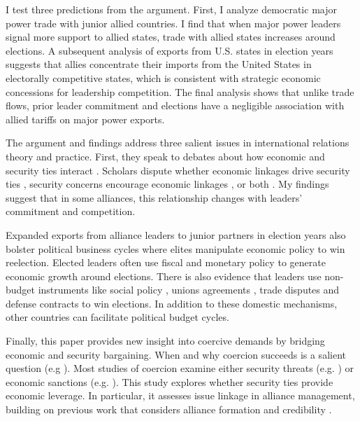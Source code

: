 \documentclass[12pt]{article}
\begin{document}
I test three predictions from the argument.
First, I analyze democratic major power trade with junior allied countries. 
I find that when major power leaders signal more support to allied states, trade with allied states increases around elections. 
A subsequent analysis of exports from U.S. states in election years suggests that allies concentrate their imports from the United States in electorally competitive states, which is consistent with strategic economic concessions for leadership competition.
The final analysis shows that unlike trade flows, prior leader commitment and elections have a negligible association with allied tariffs on major power exports. 


The argument and findings address three salient issues in international relations theory and practice. 
First, they speak to debates about how economic and security ties interact \citep{Mastanduno2009, Poast2019}. 
Scholars dispute whether economic linkages drive security ties \citep{BiglaiserDeRouen2007, Fordham2010, Kimball2010}, security concerns encourage economic linkages \citep{Gowa1995, Li2003, LongLeeds2006, GowaMansfield2004}, or both \citep{BiglaiserDeRouen2009, KinneBunte2018}. 
My findings suggest that in some alliances, this relationship changes with leaders' commitment and competition.


Expanded exports from alliance leaders to junior partners in election years also bolster political business cycles where elites manipulate economic policy to win reelection. 
Elected leaders often use fiscal \citep{Rogoff1987} and monetary policy \citep{ClarkHallerberg2000} to generate economic growth around elections. 
There is also evidence that leaders use non-budget instruments like social policy \citep{Philips2020}, unions agreements \citep{Ahlquist2010}, trade disputes \citep{Conconietal2017} and defense contracts \citep{DerouenHeo2000} to win elections. 
In addition to these domestic mechanisms, other countries can facilitate political budget cycles. 


Finally, this paper provides new insight into coercive demands by bridging economic and security bargaining.
When and why coercion succeeds is a salient question (e.g \citep{Sechser2010, Sechser2018, Cebuletal2021}).  
Most studies of coercion examine either security threats (e.g. \citep{HorowitzReiter2001, Sechser2011}) or economic sanctions (e.g. \citep{Marinov2005, Allen2008, Escriba-FolchWright2010}).
This study explores whether security ties provide economic leverage. 
In particular, it assesses issue linkage in alliance management, building on previous work that considers alliance formation \citep{Poast2012} and credibility \citep{Davis2008, Poast2013}. 
\end{document}
